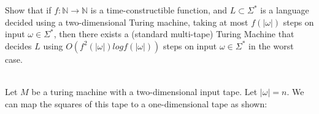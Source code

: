 \documentclass{assignment}
\begin{document}
\begin{problemlist}
\pbitem
\begin{problem}
Show that if $f:\mathbb{N}\rightarrow \mathbb{N}$ is a time-constructible function, and $L\subset \Sigma^*$ is a language decided using a two-dimensional Turing machine, taking at most $f(|\omega|)$ steps on input $\omega \in \Sigma^*$, then there exists a (standard multi-tape) Turing Machine that decides $L$ using $O(f^2(|\omega|)logf(|\omega|))$ steps on input $\omega \in \Sigma^*$ in the worst case.\\
\end{problem}
\begin{answer}
\\
Let $M$ be a turing machine with a two-dimensional input tape. Let $|\omega|=n$. We can map the squares of this tape to a one-dimensional tape as shown:\\


\end{answer}
\end{problemlist}
\end{document}
